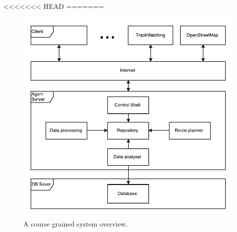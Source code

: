
<<<<<<< HEAD
=======
\begin{figure}[h!]
  \centering
    \includegraphics[width=1\textwidth]{figures/architecture.pdf}
    \caption{A course grained system overview.}
    \label{fig:systemoverview}
\end{figure}

